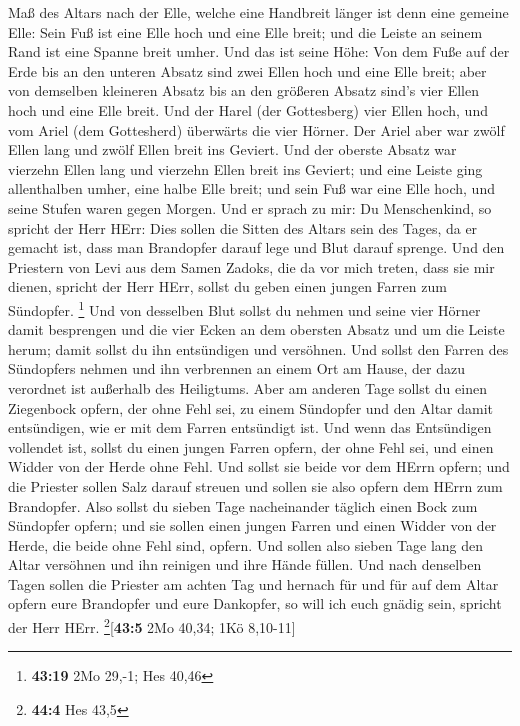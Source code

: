 Maß des Altars nach der Elle, welche eine Handbreit länger ist denn eine
gemeine Elle: Sein Fuß ist eine Elle hoch und eine Elle breit; und die
Leiste an seinem Rand ist eine Spanne breit umher.  Und
das ist seine Höhe: Von dem Fuße auf der Erde bis an den unteren Absatz
sind zwei Ellen hoch und eine Elle breit; aber von demselben kleineren
Absatz bis an den größeren Absatz sind's vier Ellen hoch und eine Elle
breit.  Und der Harel (der Gottesberg) vier Ellen hoch,
und vom Ariel (dem Gottesherd) überwärts die vier Hörner.
 Der Ariel aber war zwölf Ellen lang und zwölf Ellen
breit ins Geviert.  Und der oberste Absatz war vierzehn
Ellen lang und vierzehn Ellen breit ins Geviert; und eine Leiste ging
allenthalben umher, eine halbe Elle breit; und sein Fuß war eine Elle
hoch, und seine Stufen waren gegen Morgen.  Und er sprach
zu mir: Du Menschenkind, so spricht der Herr HErr: Dies sollen die
Sitten des Altars sein des Tages, da er gemacht ist, dass man Brandopfer
darauf lege und Blut darauf sprenge.  Und den Priestern
von Levi aus dem Samen Zadoks, die da vor mich treten, dass sie mir
dienen, spricht der Herr HErr, sollst du geben einen jungen Farren zum
Sündopfer. \footnote{\textbf{43:19} 2Mo 29,-1; Hes 40,46}
 Und von desselben Blut sollst du nehmen und seine vier
Hörner damit besprengen und die vier Ecken an dem obersten Absatz und um
die Leiste herum; damit sollst du ihn entsündigen und versöhnen.
 Und sollst den Farren des Sündopfers nehmen und ihn
verbrennen an einem Ort am Hause, der dazu verordnet ist außerhalb des
Heiligtums.  Aber am anderen Tage sollst du einen
Ziegenbock opfern, der ohne Fehl sei, zu einem Sündopfer und den Altar
damit entsündigen, wie er mit dem Farren entsündigt ist. 
Und wenn das Entsündigen vollendet ist, sollst du einen jungen Farren
opfern, der ohne Fehl sei, und einen Widder von der Herde ohne Fehl.
 Und sollst sie beide vor dem HErrn opfern; und die
Priester sollen Salz darauf streuen und sollen sie also opfern dem HErrn
zum Brandopfer.  Also sollst du sieben Tage nacheinander
täglich einen Bock zum Sündopfer opfern; und sie sollen einen jungen
Farren und einen Widder von der Herde, die beide ohne Fehl sind, opfern.
 Und sollen also sieben Tage lang den Altar versöhnen und
ihn reinigen und ihre Hände füllen.  Und nach denselben
Tagen sollen die Priester am achten Tag und hernach für und für auf dem
Altar opfern eure Brandopfer und eure Dankopfer, so will ich euch gnädig
sein, spricht der Herr HErr. \footnote{\textbf{44:4} Hes 43,5}{[}\textbf{43:5}
2Mo 40,34; 1Kö 8,10-11{]}

